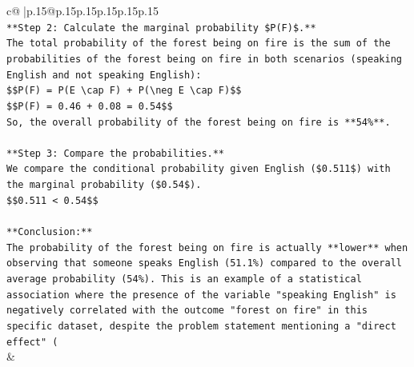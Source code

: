 \documentclass{article}
\begin{document}
{\begin{supertabular}{c@{$\;$}|p{.15\linewidth}@{}p{.15\linewidth}p{.15\linewidth}p{.15\linewidth}p{.15\linewidth}p{.15\linewidth}}
{{{\\ 
\texttt{**Step 2: Calculate the marginal probability \$P(F)\$.**} \\
\texttt{The total probability of the forest being on fire is the sum of the probabilities of the forest being on fire in both scenarios (speaking English and not speaking English):} \\
\texttt{\$\$P(F) = P(E \textbackslash{}cap F) + P(\textbackslash{}neg E \textbackslash{}cap F)\$\$} \\
\texttt{\$\$P(F) = 0.46 + 0.08 = 0.54\$\$} \\
\texttt{So, the overall probability of the forest being on fire is **54\%**.} \\
\\ 
\texttt{**Step 3: Compare the probabilities.**} \\
\texttt{We compare the conditional probability given English (\$0.511\$) with the marginal probability (\$0.54\$).} \\
\texttt{\$\$0.511 < 0.54\$\$} \\
\\ 
\texttt{**Conclusion:**} \\
\texttt{The probability of the forest being on fire is actually **lower** when observing that someone speaks English (51.1\%) compared to the overall average probability (54\%). This is an example of a statistical association where the presence of the variable "speaking English" is negatively correlated with the outcome "forest on fire" in this specific dataset, despite the problem statement mentioning a "direct effect" (} \\
            }
        }
    }
    & \\ \\


\end{supertabular}}
\end{document}
